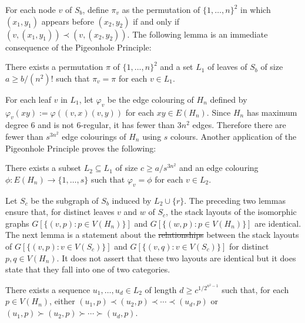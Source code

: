 \documentclass[kpfonts]{patmorin}
\renewcommand{\ge}{\geqslant}
\providecommand{\DIFadd}[1]{{\protect\color{blue}\uwave{#1}}} %
\providecommand{\DIFdel}[1]{{\protect\color{red}\sout{#1}}}                      %
\providecommand{\DIFaddbegin}{} %
\providecommand{\DIFaddend}{} %
\providecommand{\DIFdelbegin}{} %
\providecommand{\DIFdelend}{} %
\newcommand{\DIFscaledelfig}{0.5}
\newlength{\DIFdelgraphicswidth} %
\newlength{\DIFdelgraphicsheight} %
\newcommand{\DIFaddincludegraphics}[2][]{{\color{blue}\fbox{\DIFOincludegraphics[#1]{#2}}}} %
\newcommand{\DIFdelincludegraphics}[2][]{%
\sbox{\DIFdelgraphicsbox}{\DIFOincludegraphics[#1]{#2}}%
\settoboxwidth{\DIFdelgraphicswidth}{\DIFdelgraphicsbox} %
\settoboxtotalheight{\DIFdelgraphicsheight}{\DIFdelgraphicsbox} %
\scalebox{\DIFscaledelfig}{%
\parbox[b]{\DIFdelgraphicswidth}{\usebox{\DIFdelgraphicsbox}\\[-\baselineskip] \rule{\DIFdelgraphicswidth}{0em}}\llap{\resizebox{\DIFdelgraphicswidth}{\DIFdelgraphicsheight}{%
\setlength{\unitlength}{\DIFdelgraphicswidth}%
\begin{picture}(1,1)%
\thicklines\linethickness{2pt} %
{\color[rgb]{1,0,0}\put(0,0){\framebox(1,1){}}}%
{\color[rgb]{1,0,0}\put(0,0){\line( 1,1){1}}}%
{\color[rgb]{1,0,0}\put(0,1){\line(1,-1){1}}}%
\end{picture}%
}\hspace*{3pt}}} %
} %
\DeclareRobustCommand{\DIFaddbegin}{\DIFOaddbegin \let\includegraphics\DIFaddincludegraphics} %
\DeclareRobustCommand{\DIFaddend}{\DIFOaddend \let\includegraphics\DIFOincludegraphics} %
\DeclareRobustCommand{\DIFdelbegin}{\DIFOdelbegin \let\includegraphics\DIFdelincludegraphics} %
\DeclareRobustCommand{\DIFdelend}{\DIFOaddend \let\includegraphics\DIFOincludegraphics} %
\begin{document}
For each node $v$ of $S_b$, define $\pi_v$ as the permutation of $\{1,\ldots,n\}^2$ in which $(x_1,y_1)$ appears before $(x_2,y_2)$ if and only if $(v,(x_1,y_1))\prec (v,(x_2,y_2))$. The following lemma is an immediate consequence of the Pigeonhole Principle:

\begin{lem}\label{uniform_order}
    There exists a permutation $\pi$ of $\{1,\ldots,n\}^2$ and a set $L_1$ of leaves of $S_b$ of size $a\ge b/(n^2)!$ such that $\pi_{v}=\pi$ for each $v\in L_1$.
\end{lem}


For each leaf $v$ in $L_1$, let $\varphi_v$ be the edge colouring of $H_n$ defined by $\varphi_v(xy):=\varphi((v,x)(v,y))$ for each $xy\in E(H_n)$. Since $H_n$ has maximum degree $6$ and is not 6-regular, it has fewer than $3n^2$ edges.  Therefore there are fewer than $s^{3n^2}$ edge colourings of $H_n$ using $s$ colours.  Another application of the Pigeonhole Principle proves the following:

\begin{lem}\label{uniform_colour}
    There exists a subset $L_2\subseteq L_1$ of size $c\ge a/s^{3n^2}$
    and an edge colouring $\phi:E(H_n)\to\{1,\ldots,s\}$ such that $\varphi_v=\phi$ for each $v\in L_2$.
\end{lem}


Let $S_{c}$ be the subgraph of $S_b$ induced by $L_2\cup\{r\}$. The preceding two lemmas ensure that, for distinct leaves $v$ and $w$ of $S_{c}$, the stack layouts of the isomorphic graphs $G[\{(v,p):p\in V(H_n)\}]$ and $G[\{(w,p):p\in V(H_n)\}]$ are identical. The next lemma is a statement about the \DIFdelbegin \DIFdel{relationships }\DIFdelend \DIFaddbegin \DIFadd{relationship }\DIFaddend between the stack layouts of $G[\{(v,p):v\in V(S_{c})\}]$ and $G[\{(v,q):v\in V(S_{c})\}]$ for  distinct $p,q\in V(H_n)$.  It does not assert that these two layouts are identical but it does state that they fall into one of two categories.

\begin{lem}\label{forward_or_backward}
    There exists a sequence $u_1,\ldots,u_{d}\in L_2$ of length $d\ge c^{1/2^{n^2-1}}$ such that, for each $p\in V(H_n)$, either  $(u_1,p)\prec (u_2,p)\prec\cdots\prec (u_{d},p)$ or $(u_1,p)\succ (u_2,p)\succ\cdots\succ (u_{d},p)$.
\end{lem}
\end{document}
